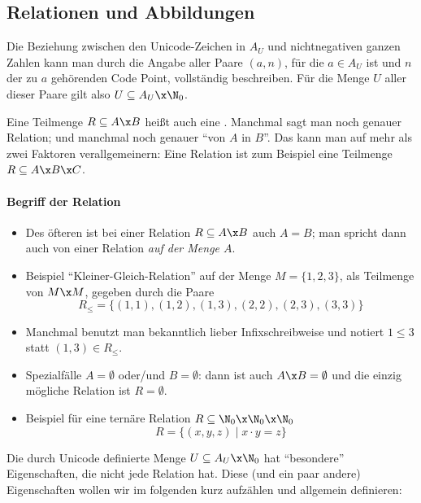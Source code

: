 \Tut\subsection{Relationen und Abbildungen}

Die Beziehung zwischen den Unicode-Zeichen in $A_U$ und nichtnegativen
ganzen Zahlen kann man durch die Angabe aller Paare $(a,n)$, für die
$a\in A_U$ ist und $n$ der zu $a$ gehörenden Code Point, vollständig
beschreiben. Für die Menge $U$ aller dieser Paare gilt also
$U\subseteq A_U\x \N_0$.

%
Eine Teilmenge $R\subseteq A\x B$ heißt auch eine
. Manchmal sagt man noch genauer
 Relation; und manchmal noch genauer
"`von $A$ in $B$"'.
%
Das kann man auf mehr als zwei Faktoren verallgemeinern:
%
Eine  Relation ist zum Beispiel eine
Teilmenge $R \subseteq A\x B\x C$.
%
\begin{tutorium}
\noindent
  \paragraph{Begriff der Relation}
  \begin{itemize}
  \item Des öfteren ist bei einer Relation $R\subseteq A\x B$ auch
    $A=B$; man spricht dann auch von einer Relation \emph{auf der
      Menge $A$}.
  \item Beispiel "`Kleiner-Gleich-Relation"' auf der Menge
    $M=\{1,2,3\}$, \dh als Teilmenge von $M\x M$, gegeben durch die
    Paare
    \[
    R_{\leq} = \{ (1,1), (1,2), (1,3), (2,2), (2,3), (3,3) \}
    \]
  \item Manchmal benutzt man bekanntlich lieber Infixschreibweise und
    notiert $1\leq 3$ statt $(1,3)\in R_{\leq}$.
  \item Spezialfälle $A=\emptyset$ oder/und $B=\emptyset$: dann ist
    auch $A\x B=\emptyset$ und die einzig mögliche Relation ist
    $R=\emptyset$.
  \item Beispiel für eine ternäre Relation
    $R\subseteq \N_0\x\N_0\x\N_0$
    \[
      R = \{ (x,y,z) \mid x\cdot y = z \}
    \]
  \end{itemize}
\end{tutorium}

Die durch Unicode definierte Menge $U\subseteq A_U\x \N_0$ hat
"`besondere"' Eigenschaften, die nicht jede Relation hat. Diese (und
ein paar andere) Eigenschaften wollen wir im folgenden kurz aufzählen
und allgemein definieren:


